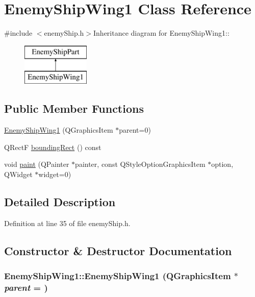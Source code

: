 \hypertarget{class_enemy_ship_wing1}{
\section{EnemyShipWing1 Class Reference}
\label{class_enemy_ship_wing1}
}


{\ttfamily \#include $<$enemyShip.h$>$}Inheritance diagram for EnemyShipWing1::\begin{figure}[H]
\begin{center}
\leavevmode
\includegraphics[height=2cm]{class_enemy_ship_wing1}
\end{center}
\end{figure}
\subsection*{Public Member Functions}
\begin{DoxyCompactItemize}
\item 
\hyperlink{class_enemy_ship_wing1_ab4d400555654ad5a17bd6055e2101f8b}{EnemyShipWing1} (QGraphicsItem $\ast$parent=0)
\item 
QRectF \hyperlink{class_enemy_ship_wing1_a54d9ca15a2b20458b7a272429ca946c9}{boundingRect} () const 
\item 
void \hyperlink{class_enemy_ship_wing1_a1082b635493db40141b28122c56327ea}{paint} (QPainter $\ast$painter, const QStyleOptionGraphicsItem $\ast$option, QWidget $\ast$widget=0)
\end{DoxyCompactItemize}


\subsection{Detailed Description}


Definition at line 35 of file enemyShip.h.

\subsection{Constructor \& Destructor Documentation}
\hypertarget{class_enemy_ship_wing1_ab4d400555654ad5a17bd6055e2101f8b}{
\subsubsection[{EnemyShipWing1}]{\setlength{\rightskip}{0pt plus 5cm}EnemyShipWing1::EnemyShipWing1 (QGraphicsItem $\ast$ {\em parent} = {})}}
\label{class_enemy_ship_wing1_ab4d400555654ad5a17bd6055e2101f8b}


